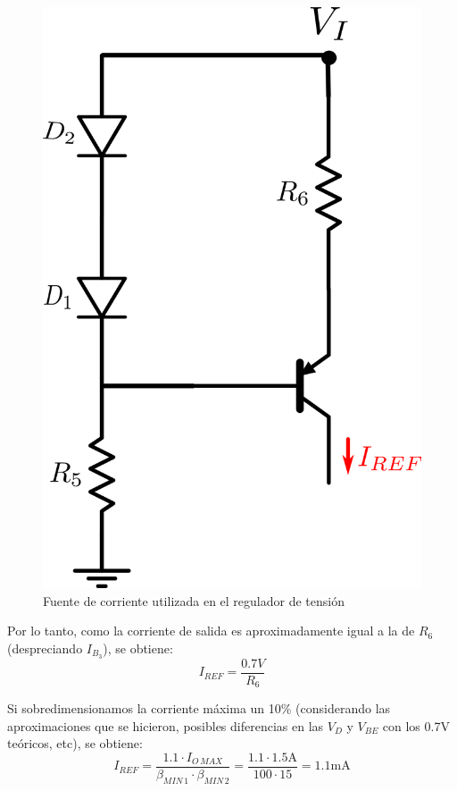 \documentclass[e2_tp1_main.tex]{subfiles}
\begin{document}
\begin{figure}[htb!]
	\centering
	\includegraphics[scale=0.5]
	{circuitos/fuente.png}
	\caption{Fuente de corriente utilizada en el regulador de tensi\'on}
	\label{fig:fuente}
\end{figure}

Por lo tanto, como la corriente de salida es aproximadamente igual a la de $R_6$ (despreciando $I_{B_3}$), se obtiene:
\begin{equation}
	I_{REF} = \frac{0.7V}{R_6}
\end{equation}

Si sobredimensionamos la corriente m\'axima un 10\% (considerando las aproximaciones que se hicieron, posibles diferencias en las $V_D$ y $V_{BE}$ con los 0.7V te\'oricos, etc), se obtiene:
\[
	I_{REF} =
	 \frac{1.1 \cdot I_{O\, MAX}}
	 {\beta_{MIN\, 1} \cdot \beta_{MIN\, 2}}		
	 = \frac{1.1 \cdot 1.5\mathrm{A}}{100 \cdot 15}
	=1.1\text{mA}
\]
\end{document}
